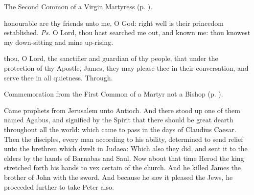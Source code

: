 
\begin{rubric}
	The Second Common of a Virgin Martyress (p. \pageref{CommonVirginMartyrII}).
\end{rubric}



\introit
{} honourable are thy friends unto me, O God: right well is their princedom established. \textit{Ps.} O Lord, thou hast searched me out, and known me: thou knowest my down-sitting and mine up-rising.

\collect
{} thou, O Lord, the sanctifier and guardian of thy people, that under the protection of thy Apostle, James, they may please thee in their conversation, and serve thee in all quietness. Through.
\begin{rubric}
	 Commemoration  from the First Common of a Martyr not a Bishop (p. \pageref{CommonMartyrNotBishopICollect}).
\end{rubric}

 Came prophets from Jerusalem unto Antioch. And there stood up one of them named Agabus, and signified by the Spirit that there should be great dearth throughout all the world: which came to pass in the days of Claudius Caesar. Then the disciples, every man according to his ability, determined to send relief unto the brethren which dwelt in Judaea: Which also they did, and sent it to the elders by the hands of Barnabas and Saul. Now about that time Herod the king stretched forth his hands to vex certain of the church. And he killed James the brother of John with the sword. And because he saw it pleased the Jews, he proceeded further to take Peter also.



